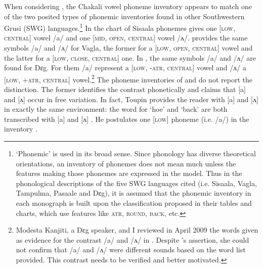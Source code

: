 When considering  \cite{Rowl65, Crou66, Gray69,   Toup95, Crou03}, the
Chakali vowel
phoneme inventory appears to match one of the two posited types of  phonemic
inventories found in other  Southwestern Grusi (SWG)
languages.\footnote{`Phonemic' is used in its broad sense. Since phonology has
diverse theoretical orientations,  an inventory of phonemes does not mean much
unless the features making those phonemes are expressed in the model.  Thus in 
the phonological descriptions of the five SWG languages cited 
(i.e. Sisaala, Vagla, Tampulma,  Pasaale and  Dɛg), it is 
assumed that the phonemic inventory in each monograph is built upon the
classification proposed in their tables and charts, which use features like
\textsc{atr}, \textsc{round}, \textsc{back}, etc.} In \citet[15]{Rowl65} the
chart of Sisaala phonemes gives one [\textsc{low},
\textsc{central}]
vowel /a/ and one [\textsc{mid}, \textsc{open}, \textsc{central}]
vowel /ʌ/. \citet[17]{Crou66}
provides the same symbols /a/ and /ʌ/ for Vagla, the former for a
[\textsc{low}, \textsc{open}, \textsc{central}] vowel and the latter for
a [\textsc{low}, \textsc{close}, \textsc{central}] one. In
\citet[3]{Crou03}, the same symbols /a/ and /ʌ/ are found for
Dɛg. For them
/a/
represent a [\textsc{low}, \textsc{-atr}, \textsc{central}] vowel
and /ʌ/ a [\textsc{low}, \textsc{+atr}, \textsc{central}]
vowel.\footnote{Modesta Kanjiti, a  Dɛg speaker,  and I reviewed  in
April 2009
the words given as evidence for the contrast /a/ and /ʌ/ in
\citet[20-21]{Crou03}. Despite  \citeauthor{Crou03}'s
assertion,   she
could not confirm that /a/ and /ʌ/ were different sounds based on the word list
provided. This contrast needs
to be verified and better motivated.}   The phoneme inventories of
\citet[16]{Toup95} and  \citet[21]{Gray69} 
do not report the distinction. The former identifies the contrast phonetically
and claims that [a]
and [ʌ] occur in free variation. In fact, Toupin provides the reader with
[a] and [ʌ] in
exactly the same environment: the word for `hoe' and `back' are both transcribed
with [a] and [ʌ]  \citep[26]{Toup95}. He postulates one [\textsc{low}] phoneme
 (i.e.  /a/) in the
inventory \citep[16]{Toup95}.


